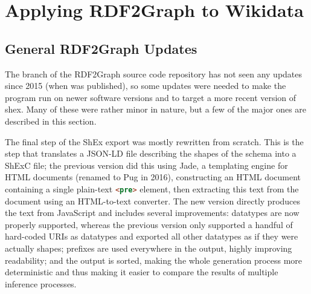
\chapter{Applying RDF2Graph to Wikidata}
\label{ch:RDF2Graph+Wikidata}

\section{General RDF2Graph Updates}
\label{sec:RDF2Graph+Wikidata:updates}

The  branch of the RDF2Graph source code repository
has not seen any updates since 2015 (when \cite{vanDam2015} was published), %
so some updates were needed to make the program run on newer software versions
and to target a more recent version of \gls{shex}.
Many of these were rather minor in nature,
but a few of the major ones are described in this section.

The final step of the ShEx export was mostly rewritten from scratch.
This is the step that translates a JSON-LD file describing the shapes of the schema
into a ShExC file;
the previous version did this using Jade,
a templating engine for HTML documents (renamed to Pug in 2016),
constructing an HTML document containing a single plain-text \lstinline[language=html]{<pre>} element,
then extracting this text from the document using an HTML-to-text converter.
The new version directly produces the text from JavaScript
and includes several improvements:
datatypes are now properly supported,
whereas the previous version only supported a handful of hard-coded URIs as datatypes
and exported all other datatypes as if they were actually shapes;
prefixes are used everywhere in the output, highly improving readability;
and the output is sorted, making the whole generation process more deterministic
and thus making it easier to compare the results of multiple inference processes.

